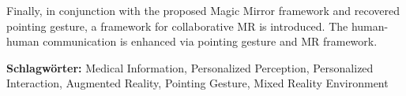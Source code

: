 Finally, in conjunction with the proposed Magic Mirror framework and recovered pointing gesture, a framework for collaborative MR is introduced. The human-human communication is enhanced via pointing gesture and MR framework. 

\textbf{Schlagwörter:} Medical Information, Personalized Perception, Personalized Interaction, Augmented Reality, Pointing Gesture, Mixed Reality Environment


%
%
